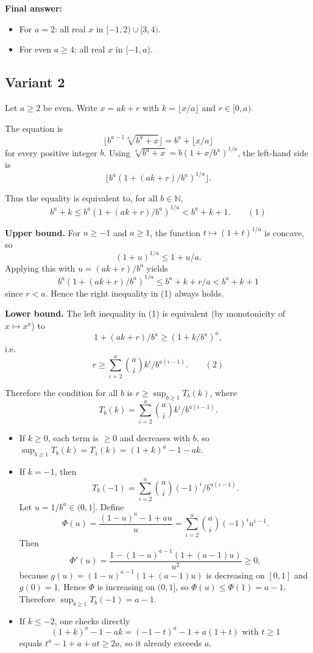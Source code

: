 \documentclass[12pt,a4paper]{article}
\theoremstyle{definition}
\begin{document}
    \textbf{Final answer:}
    \begin{itemize}
        \item For $a = 2$: all real $x$ in $[-1, 2) \cup [3, 4)$.
        \item For even $a \geq 4$: all real $x$ in $[-1, a)$.
    \end{itemize}
    \subsection{Variant 2}
    Let $a \geq 2$ be even. Write
    $x = ak + r$ with $k = \lfloor x/a \rfloor$ and $r \in [0, a)$.

    The equation is
    $$\lfloor b^{a-1} \sqrt[a]{b^a + x} \rfloor = b^a + \lfloor x/a \rfloor$$
    for every positive integer $b$. Using $\sqrt[a]{b^a + x} = b(1 + x/b^a)^{1/a}$, the left-hand side is
    $$\lfloor b^a (1 + (ak + r)/b^a)^{1/a} \rfloor.$$

    Thus the equality is equivalent to, for all $b \in \mathbb{N}$,
    $$b^a + k \leq b^a (1 + (ak + r)/b^a)^{1/a} < b^a + k + 1. \qquad (1)$$

    \textbf{Upper bound.}
    For $u \geq -1$ and $a \geq 1$, the function $t \mapsto (1 + t)^{1/a}$ is concave, so
    $$(1 + u)^{1/a} \leq 1 + u/a.$$
    Applying this with $u = (ak + r)/b^a$ yields
    $$b^a (1 + (ak + r)/b^a)^{1/a} \leq b^a + k + r/a < b^a + k + 1$$
    since $r < a$. Hence the right inequality in (1) always holds.

    \textbf{Lower bound.}
    The left inequality in (1) is equivalent (by monotonicity of $x \mapsto x^a$) to
    $$1 + (ak + r)/b^a \geq (1 + k/b^a)^a,$$
    i.e.
    $$r \geq \sum_{i=2}^a \binom{a}{i} k^i / b^{a(i-1)}. \qquad (2)$$

    Therefore the condition for all $b$ is $r \geq \sup_{b \geq 1} T_b(k)$, where
    $$T_b(k) = \sum_{i=2}^a \binom{a}{i} k^i / b^{a(i-1)}.$$

    \begin{itemize}
        \item If $k \geq 0$, each term is $\geq 0$ and decreases with $b$, so $\sup_{b \geq 1} T_b(k) = T_1(k) = (1 + k)^a - 1 - a k$.

        \item If $k = -1$, then
        $$T_b(-1) = \sum_{i=2}^a \binom{a}{i} (-1)^i / b^{a(i-1)}.$$
        Let $u = 1/b^a \in (0,1]$. Define
        $$\Phi(u) = \frac{(1 - u)^a - 1 + a u}{u} = \sum_{i=2}^a \binom{a}{i}(-1)^i u^{i-1}.$$
        Then
        $$\Phi'(u) = \frac{1 - (1 - u)^{a-1}(1 + (a - 1)u)}{u^2} \geq 0,$$
        because $g(u) = (1 - u)^{a-1}(1 + (a - 1)u)$ is decreasing on $[0,1]$ and $g(0)=1$. Hence $\Phi$ is increasing on $(0,1]$, so $\Phi(u) \leq \Phi(1) = a - 1$. Therefore $\sup_{b \geq 1} T_b(-1) = a - 1$.

        \item If $k \leq -2$, one checks directly
        $$(1 + k)^a - 1 - a k = (-1 - t)^a - 1 + a(1 + t) \text{ with } t \geq 1$$
        equals $t^a - 1 + a + a t \geq 2a$, so it already exceeds $a$.
    \end{itemize}
\end{document}
